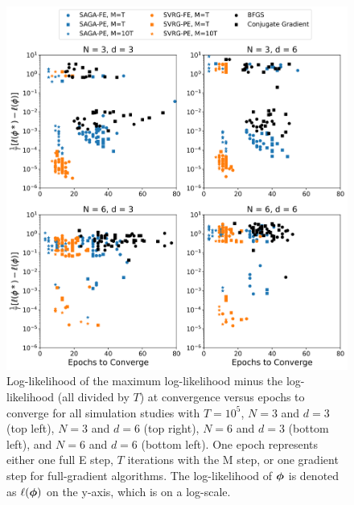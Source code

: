 \begin{figure}[h]
    \centering
    \includegraphics[width=5in]{../plt/scatter_sim_T_100000.png}
    \caption{Log-likelihood of the maximum log-likelihood minus the log-likelihood (all divided by $T$) at convergence versus epochs to converge for all simulation studies with $T=10^{5}$, $N=3$ and $d=3$ (top left), $N=3$ and $d=6$ (top right), $N=6$ and $d=3$ (bottom left), and $N=6$ and $d=6$ (bottom left). One epoch represents either one full E step, $T$ iterations with the M step, or one gradient step for full-gradient algorithms. The log-likelihood of $\boldsymbol{\phi}$ is denoted as $\ell(\boldsymbol{\phi})$ on the y-axis, which is on a log-scale.}
    \label{fig:scatter_sim}
\end{figure}

